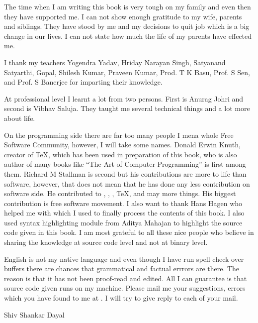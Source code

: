 \subject{Acknowledgements}
The time when I am writing this book is very tough on my family and
even then they have supported me. I can not show enough gratitude to
my wife, parents and siblings. They have stood by me and my decisions
to quit job which is a big change in our lives. I can not state how
much the life of my parents have effected me.

I thank my teachers Yogendra Yadav, Hriday Narayan Singh, Satyanand
Satyarthi, Gopal, Shilesh Kumar, Praveen Kumar, Prod. T K Basu, Prof. S
Sen, and Prof. S Banerjee for imparting their knowledge.

At professional level I learnt a lot from two persons. First is Anurag
Johri and second is Vibhav Saluja. They taught me several technical
things and a lot more about life.

On the programming side there are far too many people I mena whole
Free Software Community, however, I will take some names. Donald Erwin
Knuth, creator of \TeX{}, which has been used in preparation of this
book, who is also author of many books like ``The Art of Computer
Programming'' is first among them. Richard M Stallman is second but
his contributions are more to life than software, however, that does
not mean that he has done any less contribution on software side. He
contributed to , , , \TeX{},
 and may more things. His biggest contribution is free
software movement. I also want to thank Hans Hagen who helped me with
\ConTeXt{} which I used to finally process the contents of this book.
I also used  syntax highlighting module from Aditya Mahajan
to highlight the source code given in this book. I am most grateful to
all these nice people who believe in sharing the knowledge at source
code level and not at binary level.

English is not my native language and even though I have run spell
check over buffers there are chances that grammatical and factual
errrors are there. The reason is that it has not been proof-read and
edited. All I can guarantee is that source code given runs on my
machine. Please mail me your suggestions, errors which you have found
to me at . I will try to give
reply to each of your mail.

\startalignment[flushright]
Shiv Shankar Dayal
\stopalignment


